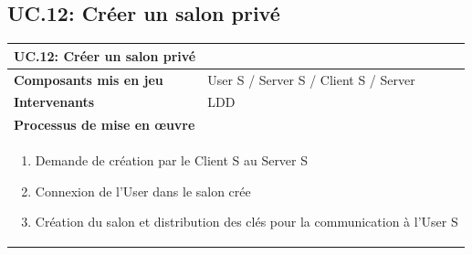 \documentclass[a4paper,11pt,french]{article}
\begin{document}

\subsection{UC.12: Créer un salon privé}
\begin{center}
	\vspace*{0.7cm}
	\begin{tabularx}{16cm}{|l|X|}
	\hline
	\multicolumn{2}{|l|}{\textbf{UC.12: Créer un salon privé}}\\
	\hline
	\textbf{Composants mis en jeu} & User S / Server S / Client S / Server \\
	\hline
	\textbf{Intervenants} & LDD \\
	\hline
	\multicolumn{2}{|l|}{\textbf{Processus de mise en \oe uvre}}\\
	\hline
	\multicolumn{2}{|p{15cm}|}{\begin{enumerate} \item Demande de création par le Client S au Server S \item Connexion de l'User dans le salon crée\item Création du salon et distribution des clés pour la communication à l'User S\end{enumerate}}\\
	\hline
	\end{tabularx}
\end{center}
\end{document}
